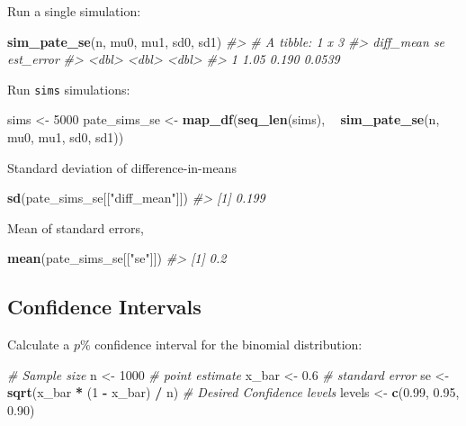 \documentclass[]{book}
\newenvironment{Shaded}{\begin{snugshade}}{\end{snugshade}}
\newcommand{\CommentTok}[1]{\textcolor[rgb]{0.56,0.35,0.01}{\textit{#1}}}
\newcommand{\DecValTok}[1]{\textcolor[rgb]{0.00,0.00,0.81}{#1}}
\newcommand{\FloatTok}[1]{\textcolor[rgb]{0.00,0.00,0.81}{#1}}
\newcommand{\KeywordTok}[1]{\textcolor[rgb]{0.13,0.29,0.53}{\textbf{#1}}}
\newcommand{\NormalTok}[1]{#1}
\newcommand{\OperatorTok}[1]{\textcolor[rgb]{0.81,0.36,0.00}{\textbf{#1}}}
\newcommand{\StringTok}[1]{\textcolor[rgb]{0.31,0.60,0.02}{#1}}
\theoremstyle{definition}
\theoremstyle{definition}
\theoremstyle{definition}
\theoremstyle{remark}
\begin{document}
Run a single simulation:

\begin{Shaded}
\begin{Highlighting}[]
\KeywordTok{sim_pate_se}\NormalTok{(n, mu0, mu1, sd0, sd1)}
\CommentTok{#> # A tibble: 1 x 3}
\CommentTok{#>   diff_mean    se est_error}
\CommentTok{#>       <dbl> <dbl>     <dbl>}
\CommentTok{#> 1      1.05 0.190    0.0539}
\end{Highlighting}
\end{Shaded}

Run \texttt{sims} simulations:

\begin{Shaded}
\begin{Highlighting}[]
\NormalTok{sims <-}\StringTok{ }\DecValTok{5000}
\NormalTok{pate_sims_se <-}
\StringTok{  }\KeywordTok{map_df}\NormalTok{(}\KeywordTok{seq_len}\NormalTok{(sims), }\OperatorTok{~}\StringTok{ }\KeywordTok{sim_pate_se}\NormalTok{(n, mu0, mu1, sd0, sd1))}
\end{Highlighting}
\end{Shaded}

Standard deviation of difference-in-means

\begin{Shaded}
\begin{Highlighting}[]
\KeywordTok{sd}\NormalTok{(pate_sims_se[[}\StringTok{"diff_mean"}\NormalTok{]])}
\CommentTok{#> [1] 0.199}
\end{Highlighting}
\end{Shaded}

Mean of standard errors,

\begin{Shaded}
\begin{Highlighting}[]
\KeywordTok{mean}\NormalTok{(pate_sims_se[[}\StringTok{"se"}\NormalTok{]])}
\CommentTok{#> [1] 0.2}
\end{Highlighting}
\end{Shaded}

\hypertarget{confidence-intervals}{%
\subsection{Confidence Intervals}\label{confidence-intervals}}

Calculate a \(p\%\) confidence interval for the binomial distribution:

\begin{Shaded}
\begin{Highlighting}[]
\CommentTok{# Sample size}
\NormalTok{n <-}\StringTok{ }\DecValTok{1000}
\CommentTok{# point estimate}
\NormalTok{x_bar <-}\StringTok{ }\FloatTok{0.6}
\CommentTok{# standard error}
\NormalTok{se <-}\StringTok{ }\KeywordTok{sqrt}\NormalTok{(x_bar }\OperatorTok{*}\StringTok{ }\NormalTok{(}\DecValTok{1} \OperatorTok{-}\StringTok{ }\NormalTok{x_bar) }\OperatorTok{/}\StringTok{ }\NormalTok{n)}
\CommentTok{# Desired Confidence levels}
\NormalTok{levels <-}\StringTok{ }\KeywordTok{c}\NormalTok{(}\FloatTok{0.99}\NormalTok{, }\FloatTok{0.95}\NormalTok{, }\FloatTok{0.90}\NormalTok{)}
\end{Highlighting}
\end{Shaded}
\end{document}
